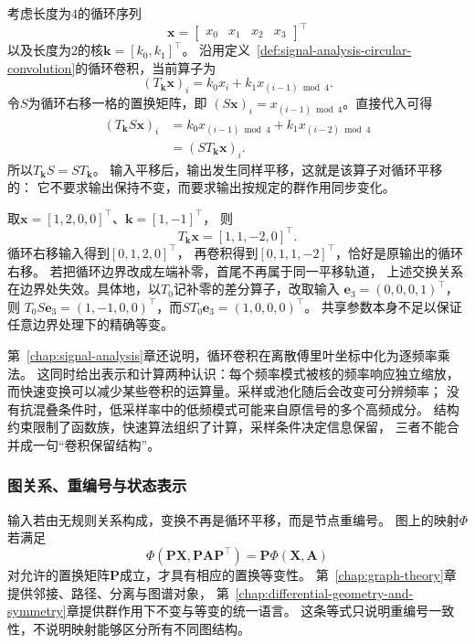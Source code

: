 考虑长度为$4$的循环序列
\[
  \bm{x}
  =
  \begin{bmatrix}
    x_0 & x_1 & x_2 & x_3
  \end{bmatrix}^{\top}
\]
以及长度为$2$的核$\bm{k}=[k_0,k_1]^{\top}$。
沿用定义~\ref{def:signal-analysis-circular-convolution}的循环卷积，当前算子为
\[
  (T_{\bm{k}}\bm{x})_i
  =
  k_0x_i+k_1x_{(i-1)\bmod 4}.
\]
令$S$为循环右移一格的置换矩阵，即
$(S\bm{x})_i=x_{(i-1)\bmod4}$。直接代入可得
\begin{align}
  (T_{\bm{k}}S\bm{x})_i
  &=
  k_0x_{(i-1)\bmod4}
  +
  k_1x_{(i-2)\bmod4}
  \nonumber\\
  &=
  (ST_{\bm{k}}\bm{x})_i.
  \label{eq:future-convolution-equivariance}
\end{align}
所以$T_{\bm{k}}S=ST_{\bm{k}}$。
输入平移后，输出发生同样平移，这就是该算子对循环平移的：
它不要求输出保持不变，而要求输出按规定的群作用同步变化。

\begin{example}[边界条件改变结构关系]
  \label{ex:future-convolution-boundary}
  取$\bm{x}=[1,2,0,0]^{\top}$、$\bm{k}=[1,-1]^{\top}$，
  则
  \[
    T_{\bm{k}}\bm{x}
    =
    [1,1,-2,0]^{\top}.
  \]
  循环右移输入得到$[0,1,2,0]^{\top}$，
  再卷积得到$[0,1,1,-2]^{\top}$，恰好是原输出的循环右移。
  若把循环边界改成左端补零，首尾不再属于同一平移轨道，
  上述交换关系在边界处失效。具体地，以$T_0$记补零的差分算子，改取输入
  $\bm e_3=(0,0,0,1)^\top$，则
  $T_0S\bm e_3=(1,-1,0,0)^\top$，而$ST_0\bm e_3=(1,0,0,0)^\top$。
  共享参数本身不足以保证任意边界处理下的精确等变。
\end{example}

第~\ref{chap:signal-analysis}章还说明，循环卷积在离散傅里叶坐标中化为逐频率乘法。
这同时给出表示和计算两种认识：每个频率模式被核的频率响应独立缩放，
而快速变换可以减少某些卷积的运算量。采样或池化随后会改变可分辨频率；
没有抗混叠条件时，低采样率中的低频模式可能来自原信号的多个高频成分。
结构约束限制了函数族，快速算法组织了计算，采样条件决定信息保留，
三者不能合并成一句“卷积保留结构”。

\subsubsection{图关系、重编号与状态表示}
\label{sec:future-sequences-graphs-state-representations}

输入若由无规则关系构成，变换不再是循环平移，而是节点重编号。
图上的映射$\Phi$若满足
\[
  \Phi(\bm{P}\bm{X},\bm{P}\bm{A}\bm{P}^{\top})
  =
  \bm{P}\Phi(\bm{X},\bm{A})
\]
对允许的置换矩阵$\bm{P}$成立，才具有相应的置换等变性。
第~\ref{chap:graph-theory}章提供邻接、路径、分离与图谱对象，
第~\ref{chap:differential-geometry-and-symmetry}章提供群作用下不变与等变的统一语言。
这条等式只说明重编号一致性，不说明映射能够区分所有不同图结构。

